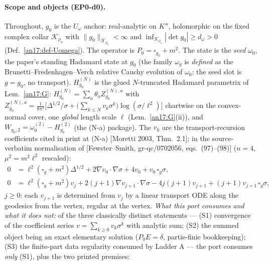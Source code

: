 \paragraph{Scope and objects (EP0-d0).}
Throughout, $g_0$ is the $U_\omega$ anchor: real-analytic on $K''$,
holomorphic on the fixed complex collar $\mathcal K_{\rho_a}$ with
$\|g_0\|_{\mathcal K_{\rho_a}}<\infty$ and $\inf_{\mathcal K_{\rho_a}}
|\det g_0|\ge d_\omega>0$ (Def.~\ref{an17:def-Uomega}). The operator is
$P_0=\square_{g_0}+m^2$. The state is the \emph{seed} $\omega_0$, the paper's
standing Hadamard state at $g_0$ (the family
$\omega_g$ is \emph{defined} as the Brunetti--Fredenhagen--Verch relative
Cauchy evolution of $\omega_0$; the seed slot is $g=g_0$, no transport).
$H^{(N)}_{g_0}$ is the glued $N$-truncated Hadamard parametrix of Lem.\
\ref{an17:G}: $H^{(N)}_{g_0}=\sum_a\theta_aZ^{(N),a}_{g_0}$ with
$Z^{(N),a}_{g_0}=\frac{1}{8\pi^2}\bigl[\Delta^{1/2}/\sigma
+\bigl(\sum_{k\le N}v_k\sigma^k\bigr)\log(\sigma/\ell^2)\bigr]$ chartwise on
the convex-normal cover, one \emph{global} length scale $\ell$ (Lem.~\ref{an17:G}(ii)),
and $W_{g_0,2}=\omega^{(2)}_0-H^{(2)}_{g_0}$ (the (N-a) package).
The $v_k$ are the transport-recursion coefficients cited in print at (N-a)
[Moretti 2003, Thm.~2.1]; in the source-verbatim normalisation of
[Fewster--Smith, gr-qc/0702056, eqs.~(97)--(98)] ($n=4$, $\mu^2=m^2\ell^2$
rescaled):
\begin{align}
 0&=\ell^2(\square_{g}+m^2)\Delta^{1/2}
    +2\nabla v_0\cdot\nabla\sigma+4v_0+v_0\,\square_g\sigma,
    \tag{D0-T0}\label{an57d0:T0}\\
 0&=\ell^2(\square_{g}+m^2)v_j+2(j{+}1)\nabla v_{j+1}\cdot\nabla\sigma
    -4j(j{+}1)v_{j+1}+(j{+}1)v_{j+1}\,\square_g\sigma ,
    \tag{D0-Tj}\label{an57d0:Tj}
\end{align}
$j\ge0$: each $v_{j+1}$ is determined from $v_j$ by a linear transport ODE
along the geodesics from the vertex, regular at the vertex. \emph{What this
port consumes and what it does not:} of the three classically distinct
statements --- (S1) convergence of the coefficient series
$v=\sum_{k\ge0}v_k\sigma^k$ with analytic sum; (S2) the summed object being
an exact elementary solution ($P_0E=\delta$, partie-finie bookkeeping);
(S3) the finite-part data regularity consumed by Ladder A --- the port
consumes \emph{only} (S1), plus the two printed premises:
